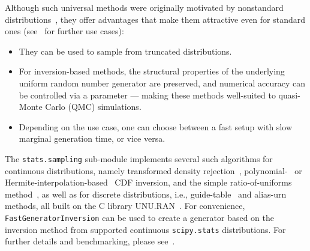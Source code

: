 \documentclass[acmsmall]{acmart}
\begin{document}
Although such universal methods were originally motivated by nonstandard
distributions~\cite{hormann2004}, they offer advantages that make them attractive
even for standard ones (see~\cite{derflinger2010} for further use cases):
\begin{itemize}
\item They can be used to sample from truncated distributions.
\item For inversion-based methods, the structural properties of the
underlying uniform random number generator are preserved, and numerical
accuracy can be controlled via a parameter --- making these methods
well-suited to quasi-Monte Carlo (QMC) simulations.
\item Depending on the use case, one can choose between a fast setup with
slow marginal generation time, or vice versa.
\end{itemize}

The \texttt{stats.sampling} sub-module implements several such algorithms for
continuous distributions, namely transformed density
rejection~\cite{hormann1995, gilks1992}, polynomial-~\cite{derflinger2010} or
Hermite-interpolation-based~\cite{hormann2003} CDF inversion, and the simple
ratio-of-uniforms method~\cite{leydold2001, leydold2003}, as well as for
discrete distributions, i.e., guide-table~\cite{chen1974} and
alias-urn~\cite{walker1977} methods, all built on the C library UNU.RAN~\cite{hormann2007}.
For convenience, \texttt{FastGeneratorInversion}
can be used to create a generator based on the inversion method from supported continuous
\texttt{scipy.stats} distributions. For further details and benchmarking,
please see~\cite{baumgarten2022}.
\end{document}
